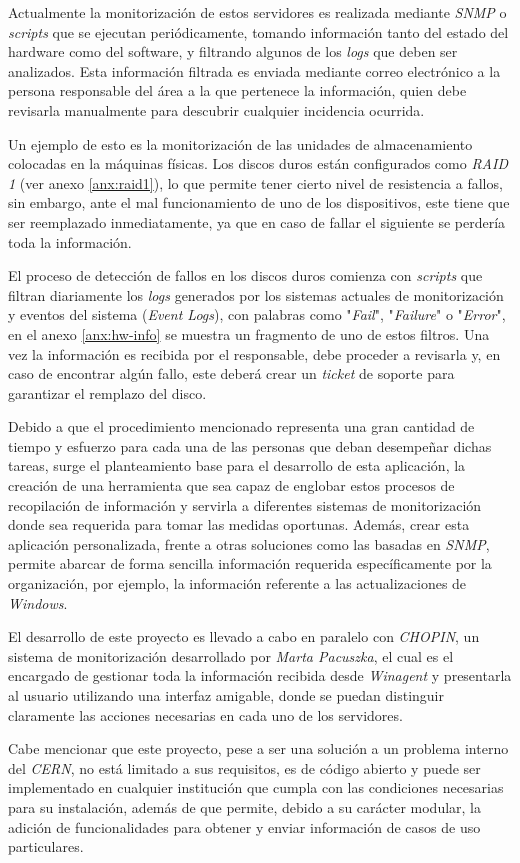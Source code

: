 Actualmente la monitorización de estos servidores es realizada mediante \textit{SNMP} o \textit{scripts} que se ejecutan periódicamente, tomando información tanto del estado del hardware como del software, y filtrando algunos de los \textit{logs} que deben ser analizados. Esta información filtrada es enviada mediante correo electrónico a la persona responsable del área a la que pertenece la información, quien debe revisarla manualmente para descubrir cualquier incidencia ocurrida.

Un ejemplo de esto es la monitorización de las unidades de almacenamiento colocadas en la máquinas físicas. Los discos duros están configurados como \textit{RAID 1} (ver anexo \ref{anx:raid1}), lo que permite tener cierto nivel de resistencia a fallos, sin embargo, ante el mal funcionamiento de uno de los dispositivos, este tiene que ser reemplazado inmediatamente, ya que en caso de fallar el siguiente se perdería toda la información.

El proceso de detección de fallos en los discos duros comienza con \textit{scripts} que filtran diariamente los \textit{logs} generados por los sistemas actuales de monitorización y eventos del sistema (\textit{Event Logs}), con palabras como "\textit{Fail}", "\textit{Failure}" o "\textit{Error}", en el anexo \ref{anx:hw-info} se muestra un fragmento de uno de estos filtros. Una vez la información es recibida por el responsable, debe proceder a revisarla y, en caso de encontrar algún fallo, este deberá crear un \textit{ticket} de soporte para garantizar el remplazo del disco.

Debido a que el procedimiento mencionado representa una gran cantidad de tiempo y esfuerzo para cada una de las personas que deban desempeñar dichas tareas, surge el planteamiento base para el desarrollo de esta aplicación, la creación de una herramienta que sea capaz de englobar estos procesos de recopilación de información y servirla a diferentes sistemas de monitorización donde sea requerida para tomar las medidas oportunas. Además, crear esta aplicación personalizada, frente a otras soluciones como las basadas en \textit{SNMP}, permite abarcar de forma sencilla información requerida específicamente por la organización, por ejemplo, la información referente a las actualizaciones de \textit{Windows}.

El desarrollo de este proyecto es llevado a cabo en paralelo con \textit{CHOPIN}, un sistema de monitorización desarrollado por \textit{Marta Pacuszka}, el cual es el encargado de gestionar toda la información recibida desde \textit{Winagent} y presentarla al usuario utilizando una interfaz amigable, donde se puedan distinguir claramente las acciones necesarias en cada uno de los servidores.

Cabe mencionar que este proyecto, pese a ser una solución a un problema interno del \textit{CERN}, no está limitado a sus requisitos, es de código abierto y puede ser implementado en cualquier institución que cumpla con las condiciones necesarias para su instalación, además de que permite, debido a su carácter modular, la adición de funcionalidades para obtener y enviar información de casos de uso particulares.
